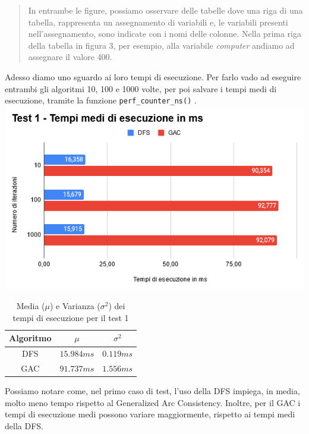 \documentclass[12pt, letterpaper]{article}
\begin{document}
\break

\begin{quote}
      In entrambe le figure, possiamo osservare delle tabelle dove una riga di una tabella, rappresenta un assegnamento
      di variabili e, le variabili presenti nell'assegnamento, sono indicate con i nomi delle colonne.
      Nella prima riga della tabella in figura 3, per esempio, alla variabile \textit{computer} andiamo ad assegnare
      il valore 400.
\end{quote}

\noindent Adesso diamo uno sguardo ai loro tempi di esecuzione. Per farlo vado ad eseguire
entrambi gli algoritmi 10, 100 e 1000 volte, per poi salvare i tempi medi di esecuzione, tramite
la funzione \lstinline|perf_counter_ns()| \cite{perf_counter_ns_docs}. \\

\includegraphics[scale=0.8]{test-1-performance.png}

\begin{table}[h!]
      \centering
      \begin{tabular}{| c | c | c |}
            \hline
            Algoritmo & $\mu$      & $\sigma^2$ \\
            \hline
            DFS       & $15.984ms$ & $0.119ms$  \\
            GAC       & $91.737ms$ & $1.556ms$  \\
            \hline
      \end{tabular}
      \caption{Media ($\mu$) e Varianza ($\sigma^2$) dei tempi di esecuzione per il test 1}
\end{table}

\noindent Possiamo notare come, nel primo caso di test, l'uso della DFS impiega, in media, molto meno
tempo rispetto al Generalized Arc Consistency.
Inoltre, per il GAC i tempi di esecuzione medi possono variare maggiormente, rispetto ai
tempi medi della DFS. \\ \break
\end{document}

